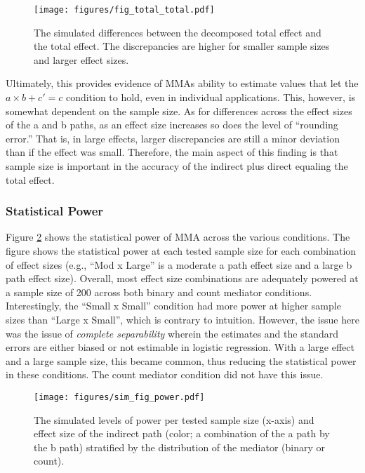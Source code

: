 \documentclass[]{DissertateUSU}
\begin{document}
\begin{figure}[tb]
\centering
\texttt{[image: figures/fig\_total\_total.pdf]}
\caption{The simulated differences between the decomposed total effect and the total effect. The discrepancies are higher for smaller sample sizes and larger effect sizes.}
\label{fig:totaltotal}
\end{figure}

Ultimately, this provides evidence of MMAs ability to estimate values
that let the \(a \times b + c' = c\) condition to hold, even in
individual applications. This, however, is somewhat dependent on the
sample size. As for differences across the effect sizes of the a and b
paths, as an effect size increases so does the level of ``rounding
error.'' That is, in large effects, larger discrepancies are still a
minor deviation than if the effect was small. Therefore, the main aspect
of this finding is that sample size is important in the accuracy of the
indirect plus direct equaling the total effect.

\subsubsection{Statistical Power}\label{statistical-power}

Figure \ref{fig_power} shows the statistical power of MMA across the
various conditions. The figure shows the statistical power at each
tested sample size for each combination of effect sizes (e.g., ``Mod x
Large'' is a moderate a path effect size and a large b path effect
size). Overall, most effect size combinations are adequately powered at
a sample size of 200 across both binary and count mediator conditions.
Interestingly, the ``Small x Small'' condition had more power at higher
sample sizes than ``Large x Small'', which is contrary to intuition.
However, the issue here was the issue of \emph{complete separability}
wherein the estimates and the standard errors are either biased or not
estimable in logistic regression. With a large effect and a large sample
size, this became common, thus reducing the statistical power in these
conditions. The count mediator condition did not have this issue.

\begin{figure}[tb]
\centering
\texttt{[image: figures/sim\_fig\_power.pdf]}
\caption{The simulated levels of power per tested sample size (x-axis) and effect size of the indirect path (color; a combination of the a path by the b path) stratified by the distribution of the mediator (binary or count).}
\label{fig_power}
\end{figure}
\end{document}
